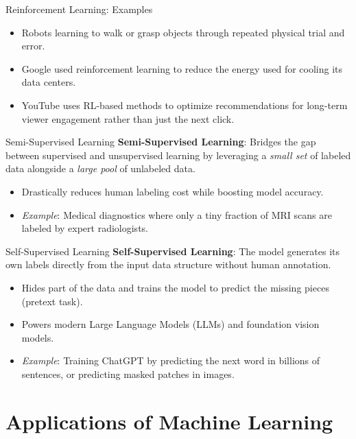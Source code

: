 \begin{frame}{Reinforcement Learning: Examples}
	\begin{itemize}
		\item Robots learning to walk or grasp objects through repeated physical trial and error.
		\item Google used reinforcement learning to reduce the energy used for cooling its data centers.
		\item YouTube uses RL-based methods to optimize recommendations for long-term viewer engagement rather than just the next click.
	\end{itemize}
\end{frame}


\begin{frame}{Semi-Supervised Learning}
    \textbf{Semi-Supervised Learning}: Bridges the gap between supervised and unsupervised learning by leveraging a \emph{small set} of labeled data alongside a \emph{large pool} of unlabeled data.
	\begin{itemize}
		\item Drastically reduces human labeling cost while boosting model accuracy.
		\item \emph{Example}: Medical diagnostics where only a tiny fraction of MRI scans are labeled by expert radiologists.
	\end{itemize}
\end{frame}


\begin{frame}{Self-Supervised Learning}
	\textbf{Self-Supervised Learning}: The model generates its own labels directly from the input data structure without human annotation.
	\begin{itemize}
		\item Hides part of the data and trains the model to predict the missing pieces (pretext task).
		\item Powers modern Large Language Models (LLMs) and foundation vision models.
		\item \emph{Example}: Training ChatGPT by predicting the next word in billions of sentences, or predicting masked patches in images.
	\end{itemize}
\end{frame}


\section{Applications of Machine Learning}


